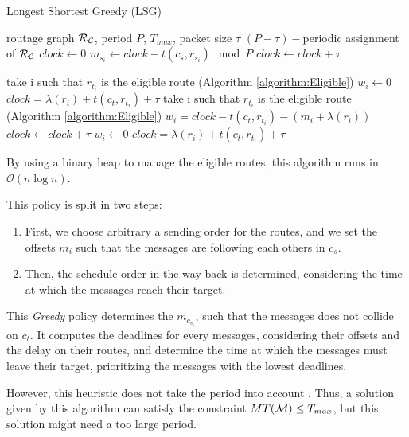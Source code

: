 \documentclass[a4paper,10pt]{article}
\begin{document}
     
    \begin{algorithm}[H]
    \caption{Longest Shortest Greedy (LSG)}
    \begin{algorithmic}
    \REQUIRE routage graph ${\cal R_{\cal C}}$, period $P$, $ T_{max}$, packet size $\tau$
    \ENSURE $(P-\tau)-$periodic assignment of ${\cal R_{\cal C}}$
    \STATE $clock \leftarrow 0$
    \STATE  $m_{s_i} \leftarrow clock - t(c_s,r_{s_i}) \mod P$
    \STATE $clock \leftarrow clock + \tau$
    \ENDFOR

    \STATE take i such that $r_{t_i}$ is the eligible route (Algorithm \ref{algorithm:Eligible})
    \STATE $w_i \leftarrow 0$
    \STATE $clock = \lambda(r_i) + t(c_t,r_{t_i}) + \tau$
    \STATE take i such that $r_{t_i}$ is the eligible route (Algorithm \ref{algorithm:Eligible})
    \STATE $w_i = clock - t(c_t,r_{t_i}) - (m_i + \lambda(r_i))$ 
    \STATE $clock \leftarrow clock + \tau$
    \ELSE
    \STATE $w_i \leftarrow 0$
    \STATE $clock = \lambda(r_i) + t(c_t,r_{t_i}) + \tau$
   \ENDIF

    \ENDWHILE

    \end{algorithmic}
    \end{algorithm}
    
    By using a binary heap to manage the eligible routes, this algorithm runs in $\mathcal{O}(n\log{}n)$.
    
    This policy is split in two steps:
    \begin{enumerate}
    \item First, we choose arbitrary a sending order for the routes, and we set the offsets $m_i$ such that the messages are following each others in $c_s$.
    \item  Then, the schedule order in the way back is determined, considering the time at which the messages reach their target. 
    \end{enumerate}
     This {\em Greedy} policy determines the $m_{c_{s_i}}$, such that the messages does not collide on $c_t$. It computes the deadlines for every messages, considering their offsets and the delay on their routes, and determine the time at which the messages must leave their target, prioritizing the messages with the lowest deadlines.
     
     However, this heuristic does not take the period into account . Thus, a solution given by this algorithm can satisfy the constraint $MT({\cal M}) \leq T_{max}$, but this solution might need a too large period.
\end{document}
